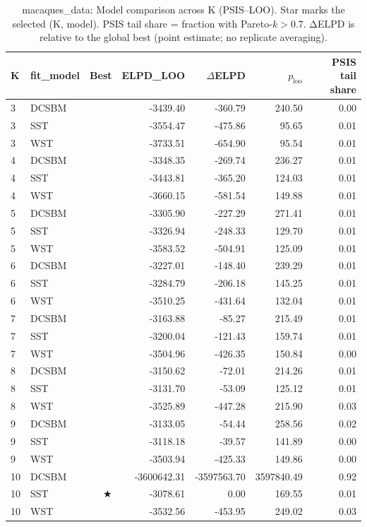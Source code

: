 \begin{table}[!h]
\centering
\caption{macaques_data: Model comparison across K (PSIS–LOO). Star marks the selected (K, model). PSIS tail share = fraction with Pareto-\(k>0.7\). ΔELPD is relative to the global best (point estimate; no replicate averaging).\\\label{tab:app-macaques_data-kselect-psisloo}}
\centering
\begin{tabular}[t]{llrrrrr}
\toprule
K & fit_model & Best & ELPD\_LOO & $\Delta$ELPD & $p_{\text{loo}}$ & PSIS tail share\\
\midrule
3 & DCSBM &  & -3439.40 & -360.79 & 240.50 & 0.00\\
3 & SST &  & -3554.47 & -475.86 & 95.65 & 0.01\\
3 & WST &  & -3733.51 & -654.90 & 95.54 & 0.01\\
4 & DCSBM &  & -3348.35 & -269.74 & 236.27 & 0.01\\
4 & SST &  & -3443.81 & -365.20 & 124.03 & 0.01\\
4 & WST &  & -3660.15 & -581.54 & 149.88 & 0.01\\
5 & DCSBM &  & -3305.90 & -227.29 & 271.41 & 0.01\\
5 & SST &  & -3326.94 & -248.33 & 129.70 & 0.01\\
5 & WST &  & -3583.52 & -504.91 & 125.09 & 0.01\\
6 & DCSBM &  & -3227.01 & -148.40 & 239.29 & 0.01\\
6 & SST &  & -3284.79 & -206.18 & 145.25 & 0.01\\
6 & WST &  & -3510.25 & -431.64 & 132.04 & 0.01\\
7 & DCSBM &  & -3163.88 & -85.27 & 215.49 & 0.01\\
7 & SST &  & -3200.04 & -121.43 & 159.74 & 0.01\\
7 & WST &  & -3504.96 & -426.35 & 150.84 & 0.00\\
8 & DCSBM &  & -3150.62 & -72.01 & 214.26 & 0.01\\
8 & SST &  & -3131.70 & -53.09 & 125.12 & 0.01\\
8 & WST &  & -3525.89 & -447.28 & 215.90 & 0.03\\
9 & DCSBM &  & -3133.05 & -54.44 & 258.56 & 0.02\\
9 & SST &  & -3118.18 & -39.57 & 141.89 & 0.00\\
9 & WST &  & -3503.94 & -425.33 & 149.86 & 0.00\\
10 & DCSBM &  & -3600642.31 & -3597563.70 & 3597840.49 & 0.92\\
10 & SST & $\bigstar$ & -3078.61 & 0.00 & 169.55 & 0.01\\
10 & WST &  & -3532.56 & -453.95 & 249.02 & 0.03\\
\bottomrule
\end{tabular}
\end{table}
